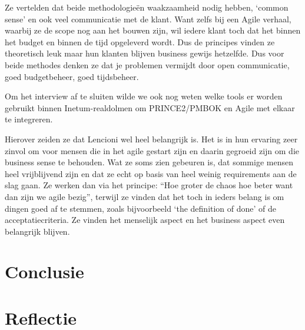 \documentclass[dutch]{hogent-article}
\begin{document}
Ze vertelden dat beide methodologieën waakzaamheid nodig hebben, ‘common sense’ en ook veel communicatie met de klant. Want zelfs bij een Agile verhaal, waarbij ze de scope nog aan het bouwen zijn, wil iedere klant toch dat het binnen het budget en binnen de tijd opgeleverd wordt. Dus de principes vinden ze theoretisch leuk maar hun klanten blijven business gewijs hetzelfde. Dus voor beide methodes denken ze dat je problemen vermijdt door open communicatie, goed budgetbeheer, goed tijdsbeheer.
\newline

Om het interview af te sluiten wilde we ook nog weten welke tools er worden gebruikt binnen Inetum-realdolmen om PRINCE2/PMBOK en Agile met elkaar te integreren. 
\newline

Hierover zeiden ze dat Lencioni wel heel belangrijk is. Het is in hun ervaring zeer zinvol om voor mensen die in het agile gestart zijn en daarin gegroeid zijn om die business sense te behouden. Wat ze soms zien gebeuren is, dat sommige mensen heel vrijblijvend zijn en dat ze echt op basis van heel weinig requirements aan de slag gaan. Ze werken dan via het principe: “Hoe groter de chaos hoe beter want dan zijn we agile bezig”, terwijl ze vinden dat het toch in ieders belang is om dingen goed af te stemmen, zoals bijvoorbeeld ‘the definition of done’ of de acceptatiecriteria. Ze vinden het menselijk aspect en het business aspect even belangrijk blijven.
\autocite{Mousaei2018}

\section{Conclusie}%
\label{sec:conclusie}


\section{Reflectie}
\label{sec:reflectie}

\printbibliography[heading=bibintoc]
\end{document}
